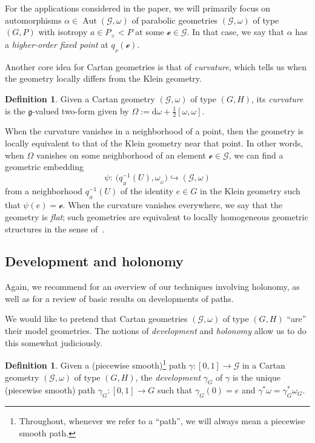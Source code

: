 \documentclass[pdftex]{sigma}
\numberwithin{equation}{section}
\theoremstyle{definition}
\newtheorem{Definition}[Theorem]{Definition}
\DeclareMathOperator{\Aut}{\mathrm{Aut}}
\newcommand{\MC}[1]{\omega_{{}_{#1}}}
\begin{document}
For the applications considered in the paper, we will primarily focus on automorphisms $\alpha\in\Aut(\mathscr{G},\omega)$ of parabolic geometries $(\mathscr{G},\omega)$ of type $(G,P)$ with isotropy $a\in P_+<P$ at some $\mathscr{e}\in\mathscr{G}$. In that case, we say that $\alpha$ has a \emph{higher-order fixed point} at $q_{{}_P}(\mathscr{e})$.

Another core idea for Cartan geometries is that of \emph{curvature}, which tells us when the geometry locally differs from the Klein geometry.

\begin{Definition}Given a Cartan geometry $(\mathscr{G},\omega)$ of type $(G,H)$, its \emph{curvature} is the $\mathfrak{g}$-valued two-form given by $\Omega:=\mathrm{d}\omega+\tfrac{1}{2}[\omega,\omega]$.\end{Definition}

When the curvature vanishes in a neighborhood of a point, then the geometry is locally equivalent to that of the Klein geometry near that point. In other words, when $\Omega$ vanishes on some neighborhood of an element $\mathscr{e}\in\mathscr{G}$, we can find a geometric embedding \[\psi\colon \ \bigl(q_{{}_H}^{-1}(U),\MC{G}\bigr)\hookrightarrow (\mathscr{G},\omega)\] from a neighborhood $q_{{}_H}^{-1}(U)$ of the identity $e\in G$ in the Klein geometry such that $\psi(e)=\mathscr{e}$. When the curvature vanishes everywhere, we say that the geometry is \emph{flat}; such geometries are equivalent to locally homogeneous geometric structures in the sense of~\cite{Goldman2022}.

\subsection{Development and holonomy}
Again, we recommend \cite{HolonomyPaper} for an overview of our techniques involving holonomy, as well as \cite[Chapter~3, Section~7]{Sharpe1997} for a review of basic results on developments of paths.

We would like to pretend that Cartan geometries $(\mathscr{G},\omega)$ of type $(G,H)$ ``are'' their model geometries. The notions of \emph{development} and \emph{holonomy} allow us to do this somewhat judiciously.

\begin{Definition}Given a (piecewise smooth)\footnote{Throughout, whenever we refer to a ``path'', we will always mean a piecewise smooth path.} path $\gamma\colon [0,1]\to\mathscr{G}$ in a Cartan geometry $(\mathscr{G},\omega)$ of type $(G,H)$, the \emph{development} $\gamma_G$ of $\gamma$ is the unique (piecewise smooth) path $\gamma_G\colon [0,1]\to G$ such that $\gamma_G(0)=e$ and $\gamma^*\omega=\gamma_G^*\omega_G$.
\end{Definition}
\end{document}
